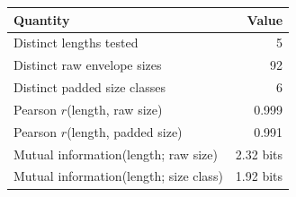 \begin{tabular}{lr}
\toprule
\textbf{Quantity} & \textbf{Value} \\
\midrule
Distinct lengths tested & 5 \\
Distinct raw envelope sizes & 92 \\
Distinct padded size classes & 6 \\
Pearson $r$(length, raw size) & 0.999 \\
Pearson $r$(length, padded size) & 0.991 \\
Mutual information(length; raw size) & 2.32 bits \\
Mutual information(length; size class) & 1.92 bits \\
\bottomrule
\end{tabular}
